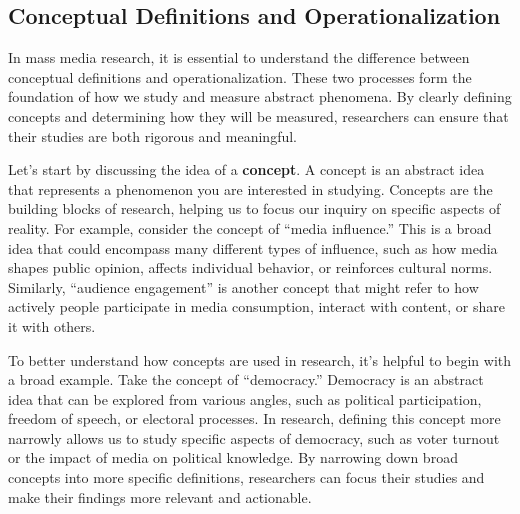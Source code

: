 \documentclass[
]{book}
\begin{document}
\subsection{Conceptual Definitions and Operationalization}\label{conceptual-definitions-and-operationalization}

In mass media research, it is essential to understand the difference between conceptual definitions and operationalization. These two processes form the foundation of how we study and measure abstract phenomena. By clearly defining concepts and determining how they will be measured, researchers can ensure that their studies are both rigorous and meaningful.

Let's start by discussing the idea of a \textbf{concept}. A concept is an abstract idea that represents a phenomenon you are interested in studying. Concepts are the building blocks of research, helping us to focus our inquiry on specific aspects of reality. For example, consider the concept of ``media influence.'' This is a broad idea that could encompass many different types of influence, such as how media shapes public opinion, affects individual behavior, or reinforces cultural norms. Similarly, ``audience engagement'' is another concept that might refer to how actively people participate in media consumption, interact with content, or share it with others.

To better understand how concepts are used in research, it's helpful to begin with a broad example. Take the concept of ``democracy.'' Democracy is an abstract idea that can be explored from various angles, such as political participation, freedom of speech, or electoral processes. In research, defining this concept more narrowly allows us to study specific aspects of democracy, such as voter turnout or the impact of media on political knowledge. By narrowing down broad concepts into more specific definitions, researchers can focus their studies and make their findings more relevant and actionable.
\end{document}

